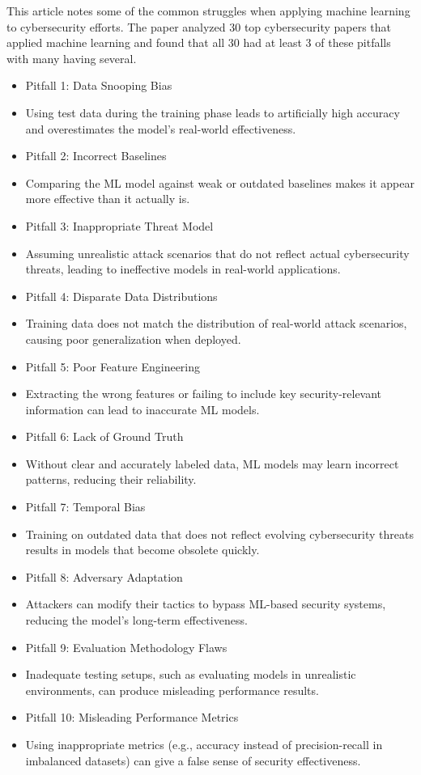 \documentclass{article}
\begin{document}
This article notes some of the common struggles when applying machine learning to cybersecurity efforts. The paper analyzed 30 top cybersecurity papers that applied machine learning and found that all 30 had at least 3 of these pitfalls with many having several.

\begin{itemize}
  \item[] Pitfall 1: Data Snooping Bias
    \item Using test data during the training phase leads to artificially high accuracy and overestimates the model's real-world effectiveness.
  \item[] Pitfall 2: Incorrect Baselines
    \item Comparing the ML model against weak or outdated baselines makes it appear more effective than it actually is.
  \item[] Pitfall 3: Inappropriate Threat Model
    \item Assuming unrealistic attack scenarios that do not reflect actual cybersecurity threats, leading to ineffective models in real-world applications.
  \item[] Pitfall 4: Disparate Data Distributions
    \item Training data does not match the distribution of real-world attack scenarios, causing poor generalization when deployed.
  \item[] Pitfall 5: Poor Feature Engineering
    \item Extracting the wrong features or failing to include key security-relevant information can lead to inaccurate ML models.
  \item[] Pitfall 6: Lack of Ground Truth
    \item Without clear and accurately labeled data, ML models may learn incorrect patterns, reducing their reliability.
  \item[] Pitfall 7: Temporal Bias
    \item Training on outdated data that does not reflect evolving cybersecurity threats results in models that become obsolete quickly.
  \item[] Pitfall 8: Adversary Adaptation
    \item Attackers can modify their tactics to bypass ML-based security systems, reducing the model's long-term effectiveness.
  \item[] Pitfall 9: Evaluation Methodology Flaws
    \item Inadequate testing setups, such as evaluating models in unrealistic environments, can produce misleading performance results.
  \item[] Pitfall 10: Misleading Performance Metrics
    \item Using inappropriate metrics (e.g., accuracy instead of precision-recall in imbalanced datasets) can give a false sense of security effectiveness.
\end{itemize}
\end{document}
